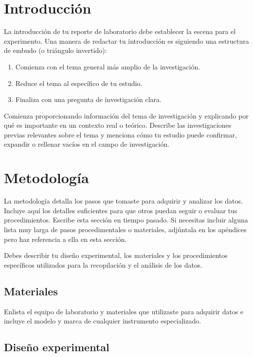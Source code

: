 \documentclass{replab}
\begin{document}
	
	\section{Introducción}

	La introducción de tu reporte de laboratorio debe establecer la escena para el experimento. Una manera de redactar tu introducción es siguiendo una estructura de embudo (o triángulo invertido):
	\begin{enumerate}
		\item Comienza con el tema general más amplio de la investigación.
		\item Reduce el tema al específico de tu estudio.
		\item Finaliza con una pregunta de investigación clara.
	\end{enumerate}

	Comienza proporcionando información del tema de investigación y explicando por qué es importante en un contexto real o teórico. Describe las investigaciones previas relevantes sobre el tema y menciona cómo tu estudio puede confirmar, expandir o rellenar vacíos en el campo de investigación.\autocite{bhandari-2022}

	\section{Metodología}

	La metodología detalla los pasos que tomaste para adquirir y analizar los datos. Incluye aquí los detalles suficientes para que otros puedan seguir o evaluar tus procedimientos. Escribe esta sección en tiempo pasado. Si necesitas incluir alguna lista muy larga de pasos procedimentales o materiales, adjúntala en los apéndices pero haz referencia a ella en esta sección. 
	
	Debes describir tu diseño experimental, los materiales y los procedimientos específicos utilizados para la recopilación y el análisis de los datos.

	\subsection{Materiales}

	Enlista el equipo de laboratorio y materiales que utilizaste para adquirir datos e incluye el modelo y marca de cualquier instrumento especializado.

	\subsection{Diseño experimental}
\end{document}
